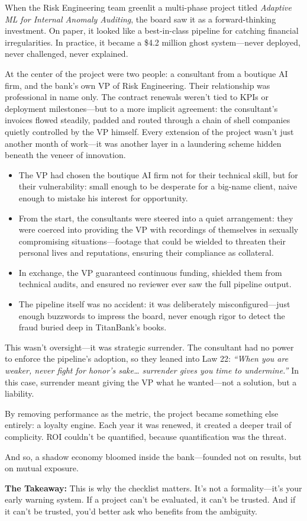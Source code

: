 When the Risk Engineering team greenlit a multi-phase project titled \textit{Adaptive ML for Internal Anomaly Auditing}, the board saw it as a forward-thinking investment. On paper, it looked like a best-in-class pipeline for catching financial irregularities. In practice, it became a \$4.2 million ghost system—never deployed, never challenged, never explained.

At the center of the project were two people: a consultant from a boutique AI firm, and the bank’s own VP of Risk Engineering. Their relationship was professional in name only. The contract renewals weren’t tied to KPIs or deployment milestones—but to a more implicit agreement: the consultant’s invoices flowed steadily, padded and routed through a chain of shell companies quietly controlled by the VP himself. Every extension of the project wasn’t just another month of work—it was another layer in a laundering scheme hidden beneath the veneer of innovation.

\begin{itemize}
  \item The VP had chosen the boutique AI firm not for their technical skill, but for their vulnerability: small enough to be desperate for a big-name client, naive enough to mistake his interest for opportunity.
  \item From the start, the consultants were steered into a quiet arrangement: they were coerced into providing the VP with recordings of themselves in sexually compromising situations—footage that could be wielded to threaten their personal lives and reputations, ensuring their compliance as collateral.
  \item In exchange, the VP guaranteed continuous funding, shielded them from technical audits, and ensured no reviewer ever saw the full pipeline output.
  \item The pipeline itself was no accident: it was deliberately misconfigured—just enough buzzwords to impress the board, never enough rigor to detect the fraud buried deep in TitanBank’s books.
\end{itemize}

This wasn’t oversight—it was strategic surrender. The consultant had no power to enforce the pipeline’s adoption, so they leaned into Law 22: \textit{“When you are weaker, never fight for honor’s sake… surrender gives you time to undermine.”} In this case, surrender meant giving the VP what he wanted—not a solution, but a liability.

By removing performance as the metric, the project became something else entirely: a loyalty engine.  
Each year it was renewed, it created a deeper trail of complicity.  
ROI couldn’t be quantified, because quantification was the threat.  

And so, a shadow economy bloomed inside the bank—founded not on results, but on mutual exposure.

\medskip

\textbf{The Takeaway:}  
This is why the checklist matters. It's not a formality—it’s your early warning system.  
If a project can’t be evaluated, it can’t be trusted.  
And if it can’t be trusted, you’d better ask who benefits from the ambiguity.
